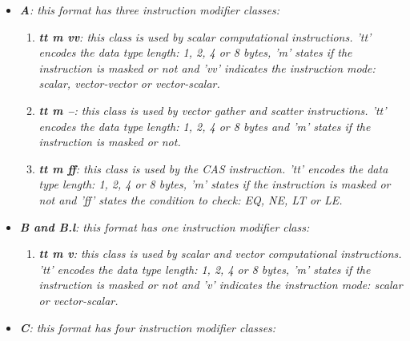             \begin{itemize}

                \item \textit{\textbf{A}: this format has three instruction modifier classes:}

                    \begin{enumerate}

                        \item \textit{\textbf{tt m vv}: this class is used by scalar computational instructions. 'tt' encodes the data type length: 1, 2, 4 or 8 bytes, 'm' states if the instruction is masked or not and 'vv' indicates the instruction mode: scalar, vector-vector or vector-scalar.}

                        \item \textit{\textbf{tt m --}: this class is used by vector gather and scatter instructions. 'tt' encodes the data type length: 1, 2, 4 or 8 bytes and 'm' states if the instruction is masked or not.}

                        \item \textit{\textbf{tt m ff}: this class is used by the CAS instruction. 'tt' encodes the data type length: 1, 2, 4 or 8 bytes, 'm' states if the instruction is masked or not and 'ff' states the condition to check: EQ, NE, LT or LE.}

                    \end{enumerate}

                \item \textit{\textbf{B and B.l}: this format has one instruction modifier class:}

                    \begin{enumerate}

                        \item \textit{\textbf{tt m v}: this class is used by scalar and vector computational instructions. 'tt' encodes the data type length: 1, 2, 4 or 8 bytes, 'm' states if the instruction is masked or not and 'v' indicates the instruction mode: scalar or vector-scalar.}

                    \end{enumerate}

                \item \textit{\textbf{C}: this format has four instruction modifier classes:}

                    \begin{enumerate}


\end{enumerate}
\end{itemize}
